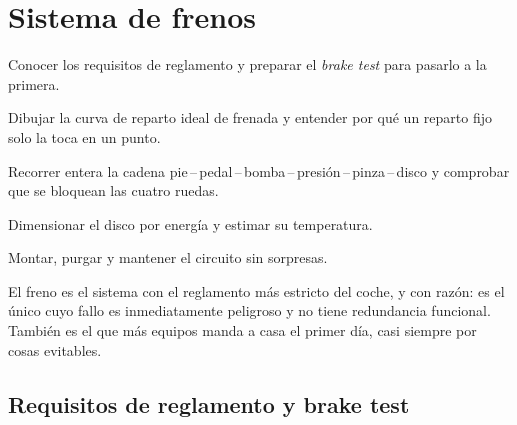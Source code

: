 \chapter{Sistema de frenos}
\label{ch:frenos}

\begin{objetivos}
  \item Conocer los requisitos de reglamento y preparar el \emph{brake test}
        para pasarlo a la primera.
  \item Dibujar la curva de reparto ideal de frenada y entender por qué un
        reparto fijo solo la toca en un punto.
  \item Recorrer entera la cadena pie\,--\,pedal\,--\,bomba\,--\,presión\,--\,pinza\,--\,disco
        y comprobar que se bloquean las cuatro ruedas.
  \item Dimensionar el disco por energía y estimar su temperatura.
  \item Montar, purgar y mantener el circuito sin sorpresas.
\end{objetivos}


El freno es el sistema con el reglamento más estricto del coche, y con razón:
es el único cuyo fallo es inmediatamente peligroso y no tiene redundancia
funcional. También es el que más equipos manda a casa el primer día, casi
siempre por cosas evitables.

\section{Requisitos de reglamento y brake test}
\label{sec:frenos:01}

